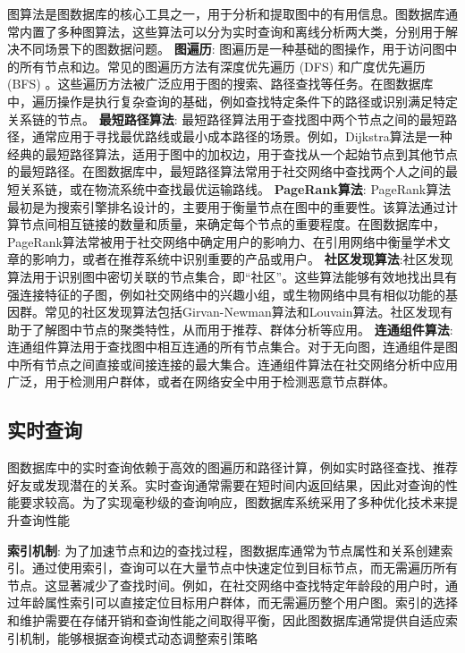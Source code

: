 图算法是图数据库的核心工具之一，用于分析和提取图中的有用信息。图数据库通常内置了多种图算法，这些算法可以分为实时查询和离线分析两大类，分别用于解决不同场景下的图数据问题。
\textbf{图遍历}: 图遍历是一种基础的图操作，用于访问图中的所有节点和边。常见的图遍历方法有深度优先遍历  (DFS)  和广度优先遍历  (BFS)  。这些遍历方法被广泛应用于图的搜索、路径查找等任务。在图数据库中，遍历操作是执行复杂查询的基础，例如查找特定条件下的路径或识别满足特定关系链的节点。
\textbf{最短路径算法}: 最短路径算法用于查找图中两个节点之间的最短路径，通常应用于寻找最优路线或最小成本路径的场景。例如，Dijkstra算法是一种经典的最短路径算法，适用于图中的加权边，用于查找从一个起始节点到其他节点的最短路径。在图数据库中，最短路径算法常用于社交网络中查找两个人之间的最短关系链，或在物流系统中查找最优运输路线。
\textbf{PageRank算法}: PageRank算法最初是为搜索引擎排名设计的，主要用于衡量节点在图中的重要性。该算法通过计算节点间相互链接的数量和质量，来确定每个节点的重要程度。在图数据库中，PageRank算法常被用于社交网络中确定用户的影响力、在引用网络中衡量学术文章的影响力，或者在推荐系统中识别重要的产品或用户。
\textbf{社区发现算法}:社区发现算法用于识别图中密切关联的节点集合，即“社区”。这些算法能够有效地找出具有强连接特征的子图，例如社交网络中的兴趣小组，或生物网络中具有相似功能的基因群。常见的社区发现算法包括Girvan-Newman算法和Louvain算法。社区发现有助于了解图中节点的聚类特性，从而用于推荐、群体分析等应用。
\textbf{连通组件算法}: 连通组件算法用于查找图中相互连通的所有节点集合。对于无向图，连通组件是图中所有节点之间直接或间接连接的最大集合。连通组件算法在社交网络分析中应用广泛，用于检测用户群体，或者在网络安全中用于检测恶意节点群体。



\subsection{实时查询}

图数据库中的实时查询依赖于高效的图遍历和路径计算，例如实时路径查找、推荐好友或发现潜在的关系。实时查询通常需要在短时间内返回结果，因此对查询的性能要求较高。为了实现毫秒级的查询响应，图数据库系统采用了多种优化技术来提升查询性能

\textbf{索引机制}: 为了加速节点和边的查找过程，图数据库通常为节点属性和关系创建索引。通过使用索引，查询可以在大量节点中快速定位到目标节点，而无需遍历所有节点。这显著减少了查找时间。例如，在社交网络中查找特定年龄段的用户时，通过年龄属性索引可以直接定位目标用户群体，而无需遍历整个用户图。索引的选择和维护需要在存储开销和查询性能之间取得平衡，因此图数据库通常提供自适应索引机制，能够根据查询模式动态调整索引策略


